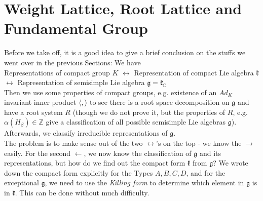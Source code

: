 \documentclass[11pt]{book}
\newcommand{\bb}[1]{\mathbb{#1}}
\newcommand{\mf}[1]{\mathfrak{#1}}
\begin{document}
\section{Weight Lattice, Root Lattice and Fundamental Group}
Before we take off, it is a good idea to give a brief conclusion on the stuffs we went over in the previous Sections: We have\\

\noindent Representations of compact group $K$ $\longleftrightarrow$ Representation of compact Lie algebra $\mf{k}$ $\longleftrightarrow$ Representation of semisimple Lie algebra $\mf{g} = \mf{k}_{\bb{C}}$\\

\noindent Then we use some properties of compact groups, e.g. existence of an $Ad_K$ invariant inner product $\langle, \rangle$ to see there is a root space decomposition on $\mf{g}$ and have a root system $R$ (though we do not prove it, but the properties of $R$, e.g. $\alpha(H_{\beta}) \in \bb{Z}$ give a classification of all possible semisimple Lie algebras $\mf{g}$). Afterwards, we classify irreducible representations of $\mf{g}$.\\

\noindent The problem is to make sense out of the two $\longleftrightarrow$'s on the top - we know the $\rightarrow$ easily. For the second $\leftarrow$, we now know the classification of $\mf{g}$ and its representations, but how do we find out the compact form $\mf{k}$ from $\mf{g}$? We wrote down the compact form explicitly for the Types $A, B, C, D$, and for the exceptional $\mf{g}$, we need to use the \textit{Killing form} to determine which element in $\mf{g}$ is in $\mf{k}$. This can be done without much difficulty.\\
\end{document}
